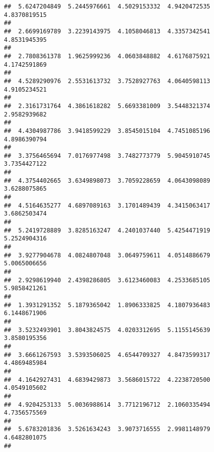 \documentclass[]{article}
\begin{document}
\begin{verbatim}
##  5.6247204849  5.2445976661  4.5029153332  4.9420472535  4.8370819515 
##                                                                       
##  2.6699169789  3.2239143975  4.1058046813  4.3357342541  4.8531945395 
##                                                                       
##  2.7808361378  1.9625999236  4.0603848882  4.6176875921  4.1742591869 
##                                                                       
##  4.5289290976  2.5531613732  3.7528927763  4.0640598113  4.9105234521 
##                                                                       
##  2.3161731764  4.3861618282  5.6693381009  3.5448321374  2.9582939682 
##                                                                       
##  4.4304987786  3.9418599229  3.8545015104  4.7451085196  4.8986390794 
##                                                                       
##  3.3756465694  7.0176977498  3.7482773779  5.9045910745  3.7354427122 
##                                                                       
##  4.3754402665  3.6349898073  3.7059228659  4.0643098089  3.6288075865 
##                                                                       
##  4.5164635277  4.6897089163  3.1701489439  4.3415063417  3.6862503474 
##                                                                       
##  5.2419728889  3.8285163247  4.2401037440  5.4254471919  5.2524904316 
##                                                                       
##  3.9277904678  4.0824807048  3.0649759611  4.0514886679  5.0065006656 
##                                                                       
##  2.9298619940  2.4398286805  3.6123460083  4.2533685105  5.9858421261 
##                                                                       
##  1.3931291352  5.1879365042  1.8906333825  4.1807936483  6.1448671906 
##                                                                       
##  3.5232493901  3.8043824575  4.0203312695  5.1155145639  3.8580195356 
##                                                                       
##  3.6661267593  3.5393506025  4.6544709327  4.8473599317  4.4869485984 
##                                                                       
##  4.1642927431  4.6839429873  3.5686015722  4.2238720500  4.0549105602 
##                                                                       
##  4.9204253133  5.0036988614  3.7712196712  2.1060335494  4.7356575569 
##                                                                       
##  5.6783201836  3.5261634243  3.9073716555  2.9981148979  4.6482801075 
##                                                                       

\end{verbatim}
\end{document}
